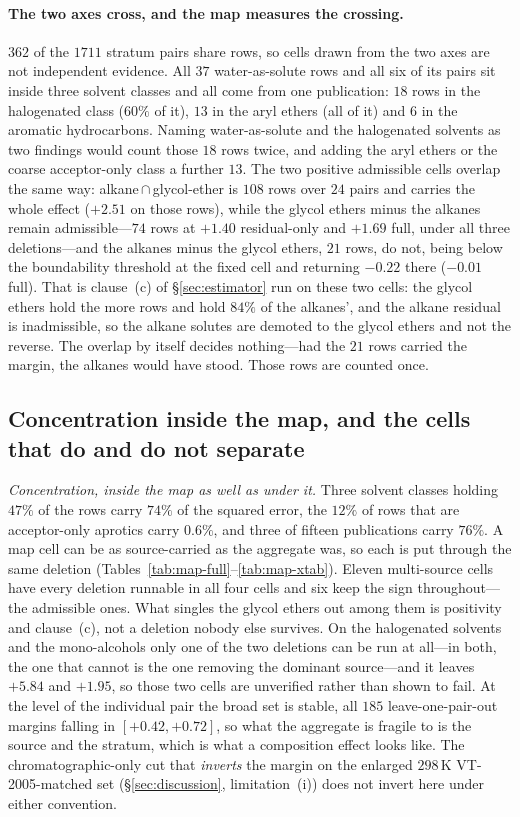 \paragraph{The two axes cross, and the map measures the crossing.} $362$ of the $1711$ stratum pairs share
rows, so cells drawn from the two axes are not independent evidence. All $37$ water-as-solute rows
and all six of its pairs sit inside three solvent classes and all come from one publication: $18$
rows in the halogenated class ($60\%$ of it), $13$ in the aryl ethers (all of it) and $6$ in the
aromatic hydrocarbons. Naming water-as-solute and the halogenated solvents as two findings would
count those $18$ rows twice, and adding the aryl ethers or the coarse acceptor-only class a further
$13$. The two positive admissible cells overlap the same way: alkane\,$\cap$\,glycol-ether is $108$
rows over $24$ pairs and carries the whole effect ($+2.51$ on those rows), while the glycol ethers
minus the alkanes remain admissible---$74$ rows at $+1.40$ residual-only and $+1.69$ full, under all
three deletions---and the alkanes minus the glycol ethers, $21$ rows, do not, being below the
boundability threshold at the fixed cell and returning $-0.22$ there ($-0.01$ full). That is
clause~(c) of \S\ref{sec:estimator} run on these two cells: the glycol ethers hold the more rows and
hold $84\%$ of the alkanes', and the alkane residual is inadmissible, so the alkane solutes are
demoted to the glycol ethers and not the reverse. The overlap by itself decides nothing---had the
$21$ rows carried the margin, the alkanes would have stood.
Those rows are counted once.

\subsection{Concentration inside the map, and the cells that do and do not separate}
\label{sec:si-map-cells}
\emph{Concentration, inside the map as well as under it.} Three solvent classes holding $47\%$ of the
rows carry $74\%$ of the squared error, the $12\%$ of rows that are acceptor-only aprotics carry
$0.6\%$, and three of fifteen publications carry $76\%$. A map cell can be as source-carried as the
aggregate was, so each is put through the same deletion (Tables~\ref{tab:map-full}--\ref{tab:map-xtab}).
Eleven multi-source cells have every deletion runnable in all four cells and six keep the sign
throughout---the admissible ones. What singles the glycol ethers out among them is positivity and
clause~(c), not a deletion nobody else survives. On the halogenated solvents and the mono-alcohols only one of the two deletions can be run
at all---in both, the one that cannot is the one removing the dominant source---and it leaves
$+5.84$ and $+1.95$, so those two cells are unverified rather than shown to fail. At the level of the
individual pair the broad set is stable, all $185$ leave-one-pair-out margins falling in
$[+0.42,+0.72]$, so what the aggregate is fragile to is the source and the stratum, which is what a
composition effect looks like. The chromatographic-only cut that \emph{inverts} the margin on the
enlarged $298$\,K VT-2005-matched set (\S\ref{sec:discussion}, limitation~(i)) does not invert here
under either convention.

